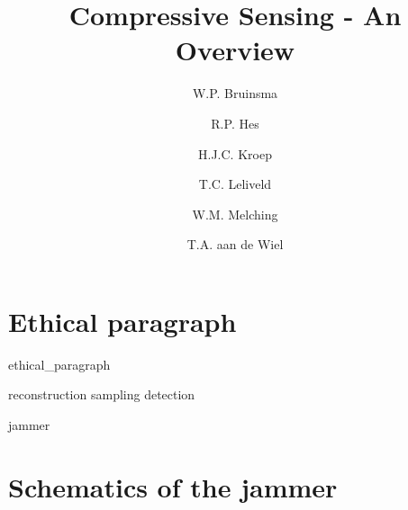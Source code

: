 \documentclass[a4paper, openany, oneside]{memoir}
\title{Compressive Sensing - An Overview}
\author{W.P. Bruinsma \and R.P. Hes \and H.J.C. Kroep \and T.C. Leliveld \and W.M. Melching \and T.A. aan de Wiel}
\begin{document}
\chapter{Ethical paragraph}
\label{ap:ethical}
{ethical_paragraph}


{reconstruction}
{sampling}
{detection}

{jammer}


\chapter{Schematics of the jammer}
\label{ap:jammer}

\end{document}
